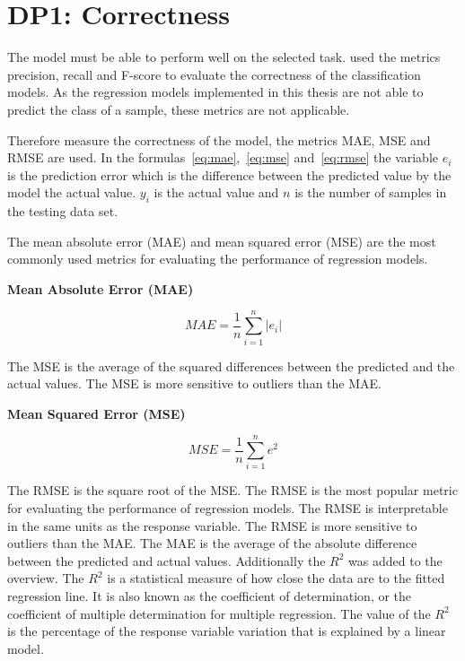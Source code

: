 \section{DP1: Correctness}\label{sec:dp2:-correctness}


The model must be able to perform well on the selected task.
\cite{siebert2022construction} used the metrics precision, recall and F-score
to evaluate the correctness of the classification models.
As the regression models implemented in this thesis are not able to predict
the class of a sample, these metrics are not applicable.

Therefore measure the correctness of the model, the metrics MAE, MSE and RMSE are used.
In the formulas~\ref{eq:mae},~\ref{eq:mse} and~\ref{eq:rmse} the variable
$e_i$ is the prediction
error which is the difference between the predicted value by the model the
actual value.
$y_i$ is the actual value and $n$ is the number of samples in the testing
data set.

The mean absolute error (MAE) and mean squared error (MSE) are the most
commonly used metrics for
evaluating the performance of regression models.

\textbf{Mean Absolute Error (MAE)}

\begin{tcolorbox}[arc=0pt,boxrule=0.5pt]
\begin{equation}
MAE = \frac{1}{n} \sum_{i=1}^{n} |e_i|
\label{eq:mae}
\end{equation}
\end{tcolorbox}

The MSE is the average of the squared differences between the predicted and
the actual values.
The MSE is more sensitive to outliers than the MAE.

\textbf{Mean Squared Error (MSE)}

\begin{tcolorbox}[arc=0pt,boxrule=0.5pt]
\begin{equation}
\label{eq:mse}
MSE = \frac{1}{n} \sum_{i=1}^{n} e^2
\end{equation}
\end{tcolorbox}

The RMSE is the square root of the MSE. The RMSE is the most popular metric
for evaluating the
performance of regression models. The RMSE is interpretable in the same units
as the response
variable. The RMSE is more sensitive to outliers than the MAE.
The MAE is the average of the absolute difference between the predicted and
actual values.
Additionally the $R^2$ was added to the overview. The $R^2$ is a statistical
measure of how close
the data are to the fitted regression line. It is also known as the
coefficient of determination,
or the coefficient of multiple determination for multiple regression. The
value of the $R^2$ is
the percentage of the response variable variation that is explained by a
linear model.

